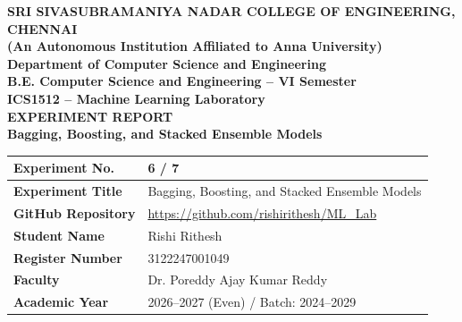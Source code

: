 \documentclass[12pt,a4paper]{article}
\begin{document}
\begin{center}
\Large\bfseries SRI SIVASUBRAMANIYA NADAR COLLEGE OF ENGINEERING, CHENNAI\\
\small (An Autonomous Institution Affiliated to Anna University)\\
\vspace{0.2cm}
\large\bfseries Department of Computer Science and Engineering\\
\large B.E. Computer Science and Engineering -- VI Semester\\
\vspace{0.3cm}
\large\bfseries ICS1512 -- Machine Learning Laboratory\\
\vspace{0.4cm}
\Large\bfseries EXPERIMENT REPORT\\
\vspace{0.2cm}
\large Bagging, Boosting, and Stacked Ensemble Models
\end{center}

\vspace{0.3cm}

\begin{table}[H]
\centering
\begin{tabular}{|p{4.2cm}|p{10.8cm}|}
\hline
\textbf{Experiment No.} & 6 / 7 \\ \hline
\textbf{Experiment Title} & Bagging, Boosting, and Stacked Ensemble Models \\ \hline
\textbf{GitHub Repository} & \href{https://github.com/rishirithesh/ML_Lab}{https://github.com/rishirithesh/ML\_Lab} \\ \hline
\textbf{Student Name} & Rishi Rithesh \\ \hline
\textbf{Register Number} & 3122247001049 \\ \hline
\textbf{Faculty} & Dr. Poreddy Ajay Kumar Reddy \\ \hline
\textbf{Academic Year} & 2026--2027 (Even) / Batch: 2024--2029 \\ \hline
\end{tabular}
\end{table}
\end{document}
